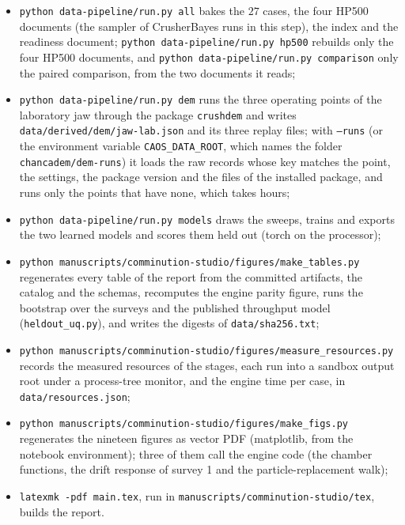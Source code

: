 \begin{itemize}
\item \texttt{python data-pipeline/\allowbreak{}run.py all} bakes the $27$ cases, the four HP500 documents (the sampler of CrusherBayes runs in this step), the index
and the readiness document; \texttt{python data-pipeline/\allowbreak{}run.py hp500} rebuilds only the four HP500 documents, and
\texttt{python data-pipeline/\allowbreak{}run.py comparison} only the paired comparison, from the two documents it reads;
\item \texttt{python data-pipeline/\allowbreak{}run.py dem} runs the three operating points of the laboratory jaw through the package \texttt{crushdem} and writes \texttt{data/\allowbreak{}derived/\allowbreak{}dem/\allowbreak{}jaw-lab.json} and its three replay files; with \texttt{--runs} (or the environment variable \texttt{CAOS\_DATA\_ROOT}, which names the folder \texttt{chancadem/\allowbreak{}dem-runs}) it loads the raw records whose key matches the point, the settings, the package version and the files of the installed package, and runs only the points that have none, which takes hours;
\item \texttt{python data-pipeline/\allowbreak{}run.py models} draws the sweeps, trains and exports the two learned models and scores them held out (torch on the
processor);
\item \texttt{python manuscripts/\allowbreak{}comminution-studio/\allowbreak{}figures/\allowbreak{}make\_tables.py} regenerates every table of the report from the committed artifacts, the
catalog and the schemas, recomputes the engine parity figure, runs the bootstrap over the surveys and the published throughput model
(\texttt{heldout\_uq.py}), and writes the digests of \texttt{data/\allowbreak{}sha256.txt};
\item \texttt{python manuscripts/\allowbreak{}comminution-studio/\allowbreak{}figures/\allowbreak{}measure\_resources.py} records the measured resources of the stages, each run into a sandbox
output root under a process-tree monitor, and the engine time per case, in \texttt{data/\allowbreak{}resources.json};
\item \texttt{python manuscripts/\allowbreak{}comminution-studio/\allowbreak{}figures/\allowbreak{}make\_figs.py} regenerates the nineteen figures as vector PDF (matplotlib, from the
notebook environment); three of them call the engine code (the chamber functions, the drift response of survey 1 and the
particle-replacement walk);
\item \texttt{latexmk -pdf main.tex}, run in \texttt{manuscripts/\allowbreak{}comminution-studio/\allowbreak{}tex}, builds the report.
\end{itemize}

